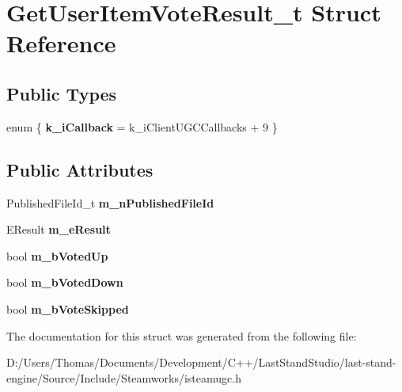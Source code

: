 \hypertarget{structGetUserItemVoteResult__t}{}\section{Get\+User\+Item\+Vote\+Result\+\_\+t Struct Reference}
\label{structGetUserItemVoteResult__t}
\subsection*{Public Types}
\begin{DoxyCompactItemize}
\item 
\hypertarget{structGetUserItemVoteResult__t_a0c396c1d2ca858069a167e17a9b94d0b}{}enum \{ {\bfseries k\+\_\+i\+Callback} = k\+\_\+i\+Client\+U\+G\+C\+Callbacks + 9
 \}\label{structGetUserItemVoteResult__t_a0c396c1d2ca858069a167e17a9b94d0b}

\end{DoxyCompactItemize}
\subsection*{Public Attributes}
\begin{DoxyCompactItemize}
\item 
\hypertarget{structGetUserItemVoteResult__t_a9fffbac1a426098ee6743a9ec56b1a9f}{}Published\+File\+Id\+\_\+t {\bfseries m\+\_\+n\+Published\+File\+Id}\label{structGetUserItemVoteResult__t_a9fffbac1a426098ee6743a9ec56b1a9f}

\item 
\hypertarget{structGetUserItemVoteResult__t_ad998e743c0881a73e5a292a323fa7970}{}E\+Result {\bfseries m\+\_\+e\+Result}\label{structGetUserItemVoteResult__t_ad998e743c0881a73e5a292a323fa7970}

\item 
\hypertarget{structGetUserItemVoteResult__t_a6860ab4ee69a27b9d55c2a0e97f6a693}{}bool {\bfseries m\+\_\+b\+Voted\+Up}\label{structGetUserItemVoteResult__t_a6860ab4ee69a27b9d55c2a0e97f6a693}

\item 
\hypertarget{structGetUserItemVoteResult__t_a42b11edd2053356adcae740db291027b}{}bool {\bfseries m\+\_\+b\+Voted\+Down}\label{structGetUserItemVoteResult__t_a42b11edd2053356adcae740db291027b}

\item 
\hypertarget{structGetUserItemVoteResult__t_ab975f128e372ef6cc67e6161b758fed0}{}bool {\bfseries m\+\_\+b\+Vote\+Skipped}\label{structGetUserItemVoteResult__t_ab975f128e372ef6cc67e6161b758fed0}

\end{DoxyCompactItemize}


The documentation for this struct was generated from the following file\+:\begin{DoxyCompactItemize}
\item 
D\+:/\+Users/\+Thomas/\+Documents/\+Development/\+C++/\+Last\+Stand\+Studio/last-\/stand-\/engine/\+Source/\+Include/\+Steamworks/isteamugc.\+h\end{DoxyCompactItemize}
